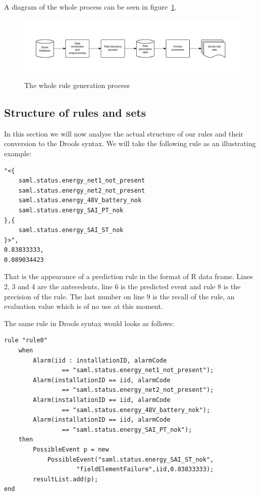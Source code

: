 \documentclass[a4paper,12pt]{article}
\begin{document}
A diagram of the whole process can be seen in figure~\ref{fig:prototypeGenProcess}.

\begin{figure}[hbtp]
\includegraphics[width=\textwidth]{img/prototypeGenProcess.pdf}
\caption{The whole rule generation process} \label{fig:prototypeGenProcess}
\end{figure}

\subsection{Structure of rules and sets}
\label{sec:structure_of_rules_and_sets}
In this section we will now analyse the actual structure of our rules and their conversion to the Drools syntax. We will take the following rule as an illustrating example:

\begin{verbatim}
"<{
	saml.status.energy_net1_not_present
	saml.status.energy_net2_not_present
	saml.status.energy_48V_battery_nok
	saml.status.energy_SAI_PT_nok
},{
	saml.status.energy_SAI_ST_nok
}>",
0.83833333,
0.089034423
\end{verbatim}

That is the appearance of a prediction rule in the format of R data frame. Lines 2, 3 and 4 are the antecedents, line 6 is the predicted event and rule 8 is the precision of the rule. The last number on line 9 is the recall of the rule, an evaluation value which is of no use at this moment.

The same rule in Drools syntax would looks as follows:

\begin{verbatim}
rule "rule0"
    when 
        Alarm(iid : installationID, alarmCode 
        		== "saml.status.energy_net1_not_present");
        Alarm(installationID == iid, alarmCode 
        		== "saml.status.energy_net2_not_present");
        Alarm(installationID == iid, alarmCode 
        		== "saml.status.energy_48V_battery_nok");
        Alarm(installationID == iid, alarmCode 
        		== "saml.status.energy_SAI_PT_nok");
    then 
        PossibleEvent p = new 
        	PossibleEvent("saml.status.energy_SAI_ST_nok",
        			"fieldElementFailure",iid,0.83833333);
        resultList.add(p);
end
\end{verbatim}
\end{document}
